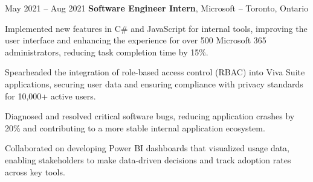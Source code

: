 \vspace{0.2 cm}

\begin{twocolentry}{
    May 2021 – Aug 2021
}
    \textbf{Software Engineer Intern}, Microsoft -- Toronto, Ontario
\end{twocolentry}

\vspace{0.10 cm}
\begin{onecolentry}
    \begin{highlights}
        \item Implemented new features in C# and JavaScript for internal tools, improving the user interface and enhancing the experience for over 500 Microsoft 365 administrators, reducing task completion time by 15\%.
        \item Spearheaded the integration of role-based access control (RBAC) into Viva Suite applications, securing user data and ensuring compliance with privacy standards for 10,000+ active users.
        \item Diagnosed and resolved critical software bugs, reducing application crashes by 20\% and contributing to a more stable internal application ecosystem.
        \item Collaborated on developing Power BI dashboards that visualized usage data, enabling stakeholders to make data-driven decisions and track adoption rates across key tools.
    \end{highlights}
\end{onecolentry}